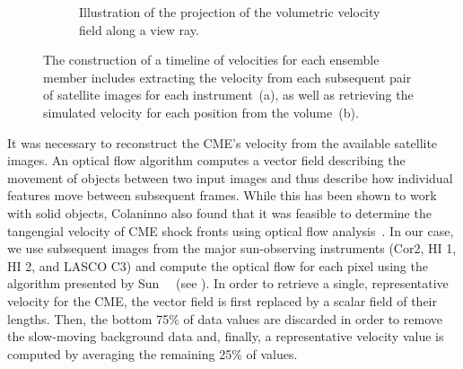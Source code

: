 \begin{figure}
\begin{subfigure}[b]{0.32\textwidth}
    \caption{Illustration of the projection of the volumetric velocity field along a view ray.}
    \label{contributions:astro:spaceweather:velocity:simulation}
\end{subfigure}
\caption{The construction of a timeline of velocities for each ensemble member includes extracting the velocity from each subsequent pair of satellite images for each instrument~(a), as well as retrieving the simulated velocity for each position from the volume~(b).}
\label{contributions:astro:spaceweather:velocity}
\end{figure}

It was necessary to reconstruct the CME's velocity from the available satellite images.  An optical flow algorithm computes a vector field describing the movement of objects between two input images and thus describe how individual features move between subsequent frames.  While this has been shown to work with solid objects, Colaninno \etal also found that it was feasible to determine the tangengial velocity of CME shock fronts using optical flow analysis~\cite{colaninno2006analysis}.  In our case, we use subsequent images from the major sun-observing instruments (Cor2, HI 1, HI 2, and LASCO C3) and compute the optical flow for each pixel using the algorithm presented by Sun \etal ~\cite{sun2010secrets}~(see ).  In order to retrieve a single, representative velocity for the CME, the vector field is first replaced by a scalar field of their lengths.  Then, the bottom 75\% of data values are discarded in order to remove the slow-moving background data and, finally, a representative velocity value is computed by averaging the remaining 25\% of values.

